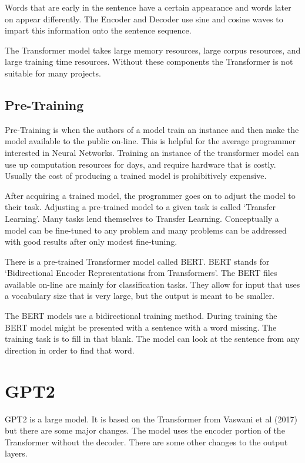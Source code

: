 Words that are early in the sentence have a certain appearance and words later on appear differently. The Encoder and Decoder use sine and cosine waves to impart this information onto the sentence sequence. 

The Transformer model takes large memory resources, large corpus resources, and large training time resources. Without these components the Transformer is not suitable for many projects.

\subsection*{Pre-Training}
Pre-Training is when the authors of a model train an instance and then make the model available to the public on-line. This is helpful for the average programmer interested in Neural Networks. Training an instance of the transformer model can use up computation resources for days, and require hardware that is costly. Usually the cost of producing a trained model is prohibitively expensive.

After acquiring a trained model, the programmer goes on to adjust the model to their task. Adjusting a pre-trained model to a given task is called `Transfer Learning'. Many tasks lend themselves to Transfer Learning. Conceptually a model can be fine-tuned to any problem and many problems can be addressed with good results after only modest fine-tuning.

There is a pre-trained Transformer model called \ac{BERT}. BERT stands for `Bidirectional Encoder Representations from Transformers'. The BERT files available on-line are mainly for classification tasks. They allow for input that uses a vocabulary size that is very large, but the output is meant to be smaller.

The BERT models use a bidirectional training method. During training the BERT model might be presented with a sentence with a word missing. The training task is to fill in that blank. The model can look at the sentence from any direction in order to find that word.

\section{GPT2}

\ac{GPT2} is a large model. It is based on the Transformer from Vaswani et al (2017)\cite{Vaswani2017AttentionIA} but there are some major changes. The model uses the encoder portion of the Transformer without the decoder. There are some other changes to the output layers.

